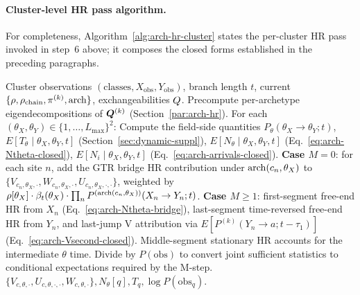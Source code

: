 \paragraph{Cluster-level HR pass algorithm.}
For completeness, Algorithm~\ref{alg:arch-hr-cluster} states the
per-cluster HR pass invoked in step~6 above; it composes the closed
forms established in the preceding paragraphs.
\begin{algorithm}[H]
\caption{Cluster HR pass: composes the closed-form primitives}
\label{alg:arch-hr-cluster}
\begin{algorithmic}[1]
\Require Cluster observations $(\text{classes}, X_{\text{obs}},
         Y_{\text{obs}})$, branch length $t$, current
         $\{\rho, \rho_{\text{chain}}, \pi^{(k)}, \mathrm{arch}\}$,
         exchangeabilities $Q$.
\State Precompute per-archetype eigendecompositions of
       $\bm{Q}^{(k)}$ (Section~\ref{par:arch-hr}).
\State For each $(\theta_X, \theta_Y) \in \{1, \ldots, L_{\max}\}^2$:
\State \quad Compute the field-side quantities
       $P_\theta(\theta_X \to \theta_Y; t)$,
       $E[T_\theta \mid \theta_X, \theta_Y, t]$
       (Section~\ref{sec:dynamic-suppl}),
       $E[N_\theta \mid \theta_X, \theta_Y, t]$
       (Eq.~\ref{eq:arch-Ntheta-closed}),
       $E[N_i \mid \theta_X, \theta_Y, t]$
       (Eq.~\ref{eq:arch-arrivals-closed}).
\State \quad \textbf{Case $M = 0$}: for each site $n$, add the GTR
       bridge HR contribution under
       $\mathrm{arch}(c_n, \theta_X)$ to $\{V_{c_n, \theta_X, \cdot},
       W_{c_n, \theta_X, \cdot}, U_{c_n, \theta_X, \cdot, \cdot}\}$,
       weighted by
       $\rho[\theta_X] \cdot \beta_t(\theta_X) \cdot
       \prod_n P^{(\mathrm{arch}(c_n, \theta_X))}(X_n \to Y_n; t)$.
\State \quad \textbf{Case $M \geq 1$}: first-segment free-end HR from
       $X_n$ (Eq.~\ref{eq:arch-Ntheta-bridge}), last-segment
       time-reversed free-end HR from $Y_n$, and last-jump V
       attribution via
       $E[P^{(k)}(Y_n \to a; t - \tau_1)]$
       (Eq.~\ref{eq:arch-Vsecond-closed}). Middle-segment stationary HR
       accounts for the intermediate $\theta$ time.
\State Divide by $P(\text{obs})$ to convert joint sufficient statistics
       to conditional expectations required by the M-step.
\State \Return $\{V_{c, \theta, \cdot}, U_{c, \theta, \cdot, \cdot},
         W_{c, \theta, \cdot}\}, N_\theta[q], T_q, \log P(\text{obs}_q)$.
\end{algorithmic}
\end{algorithm}

